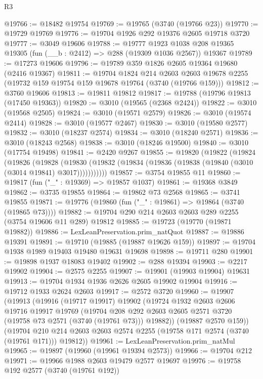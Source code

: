 \begin{lexlean}{R3}
\begin{coremodule}
@19766 := @18482 @19754
@19769 := @19765 (@3740 (@19766 @23))
@19770 := @19729 @19769
@19776 := @19704 @1926 @292 @19376 @2605 @19718 @3720
@19777 := @3049 @19606
@19788 := @19777
    @1923
    @1038
    @208
    @19365
    @19305
    (fun (__b : @2412) => @288 (@19309 @1036 @2567))
    @19367
@19789 := @17273 @19606
@19796 := @19789 @359 @1826 @2605 @19364 @19680 (@2416 @19367)
@19811 := @19704
    @1824
    @214
    @2603
    @2603
    @19678
    @2255
    (@19732 @159 @19754 @159 @19678 @19764 (@3740 (@19766 @159)))
@19812 := @3760 @19606
@19813 := @19811 @19812
@19817 := @19788 (@19796 @19813 (@17450 @19363))
@19820 := @3010 (@19565 (@2368 @2424))
@19822 := @3010 (@19568 @2505)
@19824 := @3010 (@19571 @2579)
@19826 := @3010 (@19574 @2414)
@19828 := @3010 (@19577 @2467)
@19830 := @3010 (@19580 @2577)
@19832 := @3010 (@18237 @2574)
@19834 := @3010 (@18240 @2571)
@19836 := @3010 (@18243 @2568)
@19838 := @3010 (@18246 @19500)
@19840 := @3010 (@17754 @19498)
@19841 := @2420 @9267
@19855 := @19820
    (@19822
      (@19824
        (@19826
          (@19828
            (@19830 (@19832 (@19834 (@19836 (@19838 (@19840 (@3010 (@3014 @19841) @3017)))))))))))
@19857 := @3754 @19855 @11
@19860 := @19817 (fun ("_" : @19369) => @19857 @1037)
@19861 := @19368 @3849
@19862 := @3735 @19855
@19864 := @19862 @73 @2568
@19865 := @3741 @19855
@19871 := @19776 (@19860 (fun ("_" : @19861) => @19864 (@3740 (@19865 @73))))
@19882 := @19704 @290 @214 @2603 @2603 @289 @2255 (@3754 @19606 @11 @289) @19812
@19885 := @19723 (@19770 (@19871 @19882))
@19886 := LexLeanPreservation.prim_natQuot
@19887 := @19886 @19391
@19891 := @19710 (@19885 (@19887 @19626 @159))
@19897 := @19704 @1938 @1989 @19403 @19480 @19631 @19698
@19898 := @19711 @280
@19901 := @19898 @1937 @18083 @19402
@19902 := @288 @19394
@19903 := @2217 @19902
@19904 := @2575 @2255
@19907 := @19901 (@19903 @19904) @19631
@19913 := @19704 @1934 @1936 @2626 @2605 @19902 @19904
@19916 := @19712 @1933 @2624 @2603
@19917 := @2572 @3720
@19960 := @19907
    (@19913
      (@19916
        (@19717 @19917)
        @19902
        (@19724
          @1932
          @2603
          @2606
          @19716
          @19917
          @19769
          (@19704 @208 @292 @2603 @2605 @2571 @3720 (@19758 @73 @2571 (@3740 (@19761 @73))) @19882))
        (@19887 @2570 @159))
      (@19704 @210 @214 @2603 @2603 @2574 @2255 (@19758 @171 @2574 (@3740 (@19761 @171))) @19812))
@19961 := LexLeanPreservation.prim_natMul
@19965 := @19897 (@19960 (@19961 @19394 @2573))
@19966 := @19704 @212
@19971 := @19966 @1988 @2603 @19479 @2577 @19697
@19976 := @19758 @192 @2577 (@3740 (@19761 @192))

\end{coremodule}
\end{lexlean}
